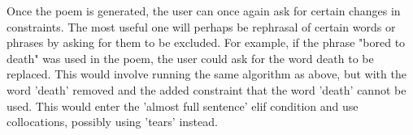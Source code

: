 Once the poem is generated, the user can once again ask for certain changes in constraints. The most useful one will perhaps be rephrasal of certain words or phrases by asking for them to be excluded. For example, if the phrase "bored to death" was used in the poem, the user could ask for the word death to be replaced. This would involve running the same algorithm as above, but with the word 'death' removed and the added constraint that the word 'death' cannot be used. This would enter the 'almost full sentence' elif condition and use collocations, possibly using 'tears' instead.



